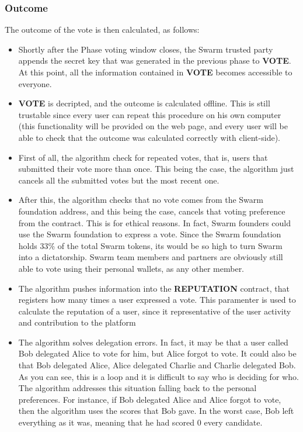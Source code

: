 \documentclass[submission, copyright,creativecommons,sharealike,noncommercial]{eptcs}
\newcommand{\Vote}{\textbf{VOTE}\xspace}
\newcommand{\Reputation}{\textbf{REPUTATION}\xspace}
\begin{document}
\subsubsection{Outcome}
		The outcome of the vote is then calculated, as follows:
		\begin{itemize}	
			\item Shortly after the Phase voting window closes, the Swarm trusted party appends the secret key that was generated in the previous phase to \Vote. At this point, all the information contained in \Vote becomes accessible to everyone.
			
			\item \Vote is decripted, and the outcome is calculated offline. This is still trustable since every user can repeat this procedure on his own computer (this functionality will be provided on the web page, and every user will be able to check that the outcome was calculated correctly with client-side).
			
			\item First of all, the algorithm check for repeated votes, that is, users that submitted their vote more than once. This being the case, the algorithm just cancels all the submitted votes but the most recent one.
			
			\item After this, the algorithm checks that no vote comes from the Swarm foundation address, and this being the case, cancels that voting preference from the contract. This is for ethical reasons. In fact, Swarm founders could use the Swarm foundation to express a vote. Since the Swarm foundation holds 33\% of the total Swarm tokens, its would be so high to turn Swarm into a dictatorship. Swarm team members and partners are obviously still able to vote using their personal wallets, as any other member.
			
			\item The algorithm pushes information into the \Reputation contract, that registers how many times a user expressed a vote. This paramenter is used to calculate the reputation of a user, since it representative of the user activity and contribution to the platform
			
			\item The algorithm solves delegation errors. In fact, it may be that a user called Bob delegated Alice to vote for him, but Alice forgot to vote. It could also be that Bob delegated Alice, Alice delegated Charlie and Charlie delegated Bob. As you can see, this is a loop and it is difficult to say who is deciding for who. The algorithm addresses this situation falling back to the personal preferences. For instance, if Bob delegated Alice and Alice forgot to vote, then the algorithm uses the scores that Bob gave. In the worst case, Bob left everything as it was, meaning that he had scored $0$ every candidate.
			

\end{itemize}
\end{document}
